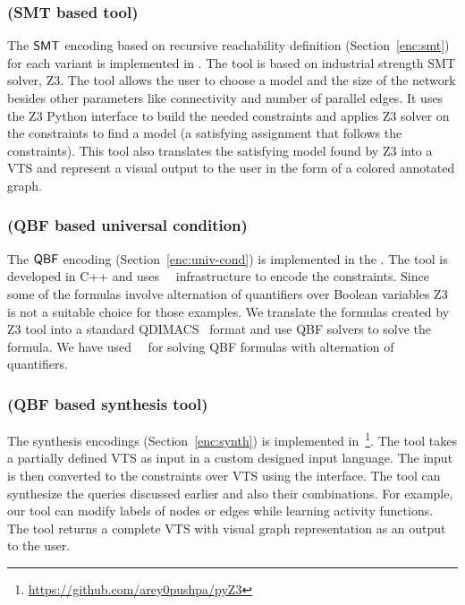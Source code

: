 \subsubsection{{\smttool} (SMT based tool)}
The $\mathsf{SMT}$ encoding based on recursive reachability definition (Section~\ref{enc:smt})  for each variant is implemented in {\smttool}.
%
The tool is based on industrial strength SMT solver, Z3. 
%
The tool allows the user to choose a model and the size
of the network besides other parameters like connectivity and number of parallel edges. 
%        
It uses the Z3 Python interface to build the needed constraints and applies Z3 solver on the constraints to find a model (a satisfying assignment that follows the constraints). 
%
This tool also translates the satisfying model found by Z3 into
a VTS and represent a visual output to the user in the form of a colored annotated graph. 
%
%
 

\subsubsection{{\qbftool} (QBF based universal condition)}
The $\mathsf{QBF}$ encoding (Section~\ref{enc:univ-cond}) is implemented in the {\qbftool}. 
%
The tool is developed in C++ and uses~\zthree~\cite{z3} infrastructure to encode the constraints.
%
Since some of the formulas involve alternation of quantifiers over Boolean variables Z3 is not a suitable choice for those examples.
%
We translate the formulas created by Z3 tool into a standard
QDIMACS~\cite{qdimacs} format and use QBF solvers to solve the formula. 
%
We have used~\depqbf~\cite{lonsing2010depqbf} for solving QBF formulas with alternation of quantifiers. 

\subsubsection{{\ourtool} (QBF based synthesis tool)}

The synthesis encodings (Section~\ref{enc:synth}) is implemented  in~\ourtool\footnote{{\url{https://github.com/arey0pushpa/pyZ3}}}.
%
The tool takes a partially defined VTS as input in a custom designed
input language.
%
The input is then converted to the constraints over VTS using the {\qbftool} interface. 
%
The tool can synthesize the queries discussed earlier and also their combinations.
%
For example, our tool can modify labels of nodes or edges while
learning activity functions.
%
The tool returns a complete VTS with visual graph representation as an output to the user.  

